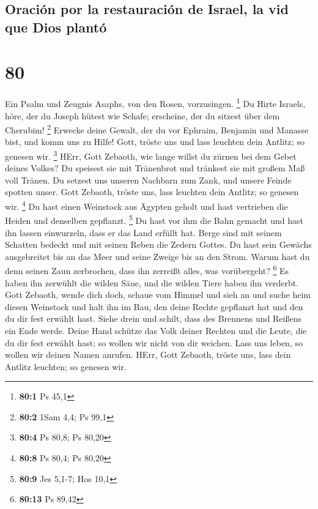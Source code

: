 \hypertarget{oraciuxf3n-por-la-restauraciuxf3n-de-israel-la-vid-que-dios-plantuxf3}{%
\subsection{Oración por la restauración de Israel, la vid que Dios
plantó}\label{oraciuxf3n-por-la-restauraciuxf3n-de-israel-la-vid-que-dios-plantuxf3}}

\hypertarget{section-79}{%
\section{80}\label{section-79}}

 Ein Psalm und Zeugnis Asaphs, von den Rosen, vorzusingen.
\footnote{\textbf{80:1} Ps 45,1}  Du Hirte Israels, höre,
der du Joseph hütest wie Schafe; erscheine, der du sitzest über dem
Cherubim! \footnote{\textbf{80:2} 1Sam 4,4; Ps 99,1} 
Erwecke deine Gewalt, der du vor Ephraim, Benjamin und Manasse bist, und
komm uns zu Hilfe!  Gott, tröste uns und lass leuchten
dein Antlitz; so genesen wir. \footnote{\textbf{80:4} Ps 80,8; Ps 80,20}
 HErr, Gott Zebaoth, wie lange willst du zürnen bei dem
Gebet deines Volkes?  Du speisest sie mit Tränenbrot und
tränkest sie mit großem Maß voll Tränen.  Du setzest uns
unseren Nachbarn zum Zank, und unsere Feinde spotten unser.
 Gott Zebaoth, tröste uns, lass leuchten dein Antlitz; so
genesen wir. \footnote{\textbf{80:8} Ps 80,4; Ps 80,20} 
Du hast einen Weinstock aus Ägypten geholt und hast vertrieben die
Heiden und denselben gepflanzt. \footnote{\textbf{80:9} Jes 5,1-7; Hos
  10,1}  Du hast vor ihm die Bahn gemacht und hast ihn
lassen einwurzeln, dass er das Land erfüllt hat.  Berge
sind mit seinem Schatten bedeckt und mit seinen Reben die Zedern Gottes.
 Du hast sein Gewächs ausgebreitet bis an das Meer und
seine Zweige bis an den Strom.  Warum hast du denn seinen
Zaun zerbrochen, dass ihn zerreißt alles, was vorübergeht? \footnote{\textbf{80:13}
  Ps 89,42}  Es haben ihn zerwühlt die wilden Säue, und
die wilden Tiere haben ihn verderbt.  Gott Zebaoth, wende
dich doch, schaue vom Himmel und sieh an und suche heim diesen Weinstock
 und halt ihn im Bau, den deine Rechte gepflanzt hat und
den du dir fest erwählt hast.  Siehe drein und schilt,
dass des Brennens und Reißens ein Ende werde.  Deine Hand
schütze das Volk deiner Rechten und die Leute, die du dir fest erwählt
hast;  so wollen wir nicht von dir weichen. Lass uns
leben, so wollen wir deinen Namen anrufen.  HErr, Gott
Zebaoth, tröste uns, lass dein Antlitz leuchten; so genesen wir.

